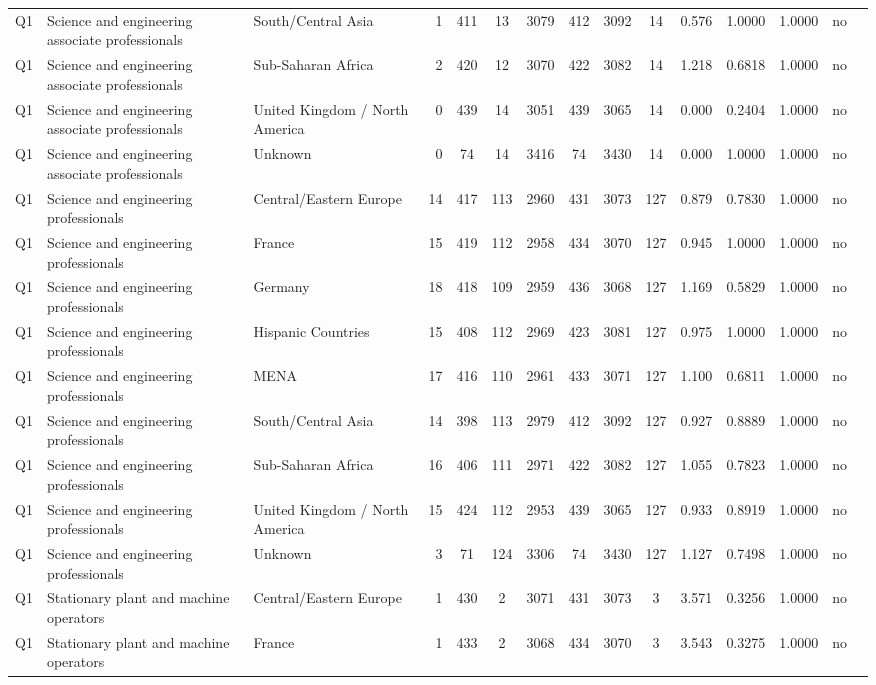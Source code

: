 \begin{longtable}{lllrcccccccccll}
Q1 & Science and engineering associate professionals & South/Central Asia & 1 & 411 & 13 & 3079 & 412 & 3092 & 14 & 0.576 & 1.0000 & 1.0000 & no \\
Q1 & Science and engineering associate professionals & Sub-Saharan Africa & 2 & 420 & 12 & 3070 & 422 & 3082 & 14 & 1.218 & 0.6818 & 1.0000 & no \\
Q1 & Science and engineering associate professionals & United Kingdom / North America & 0 & 439 & 14 & 3051 & 439 & 3065 & 14 & 0.000 & 0.2404 & 1.0000 & no \\
Q1 & Science and engineering associate professionals & Unknown & 0 & 74 & 14 & 3416 & 74 & 3430 & 14 & 0.000 & 1.0000 & 1.0000 & no \\
Q1 & Science and engineering professionals & Central/Eastern Europe & 14 & 417 & 113 & 2960 & 431 & 3073 & 127 & 0.879 & 0.7830 & 1.0000 & no \\
Q1 & Science and engineering professionals & France & 15 & 419 & 112 & 2958 & 434 & 3070 & 127 & 0.945 & 1.0000 & 1.0000 & no \\
Q1 & Science and engineering professionals & Germany & 18 & 418 & 109 & 2959 & 436 & 3068 & 127 & 1.169 & 0.5829 & 1.0000 & no \\
Q1 & Science and engineering professionals & Hispanic Countries & 15 & 408 & 112 & 2969 & 423 & 3081 & 127 & 0.975 & 1.0000 & 1.0000 & no \\
Q1 & Science and engineering professionals & MENA & 17 & 416 & 110 & 2961 & 433 & 3071 & 127 & 1.100 & 0.6811 & 1.0000 & no \\
Q1 & Science and engineering professionals & South/Central Asia & 14 & 398 & 113 & 2979 & 412 & 3092 & 127 & 0.927 & 0.8889 & 1.0000 & no \\
Q1 & Science and engineering professionals & Sub-Saharan Africa & 16 & 406 & 111 & 2971 & 422 & 3082 & 127 & 1.055 & 0.7823 & 1.0000 & no \\
Q1 & Science and engineering professionals & United Kingdom / North America & 15 & 424 & 112 & 2953 & 439 & 3065 & 127 & 0.933 & 0.8919 & 1.0000 & no \\
Q1 & Science and engineering professionals & Unknown & 3 & 71 & 124 & 3306 & 74 & 3430 & 127 & 1.127 & 0.7498 & 1.0000 & no \\
Q1 & Stationary plant and machine operators & Central/Eastern Europe & 1 & 430 & 2 & 3071 & 431 & 3073 & 3 & 3.571 & 0.3256 & 1.0000 & no \\
Q1 & Stationary plant and machine operators & France & 1 & 433 & 2 & 3068 & 434 & 3070 & 3 & 3.543 & 0.3275 & 1.0000 & no \\

\end{longtable}
